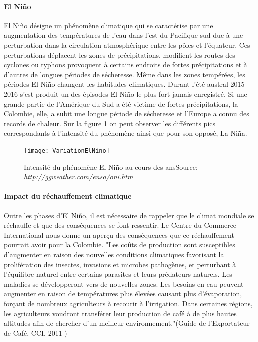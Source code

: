 


\paragraph{El Niño}El Niño désigne un phénomène climatique qui se caractérise par une augmentation des températures de l'eau dans l'est du Pacifique sud due à une perturbation dans la circulation atmosphérique entre les pôles et l'équateur. Ces perturbations déplacent les zones de précipitations, modifient les routes des cyclones ou typhons provoquent à certains endroits de fortes précipitations et à d'autres de longues périodes de sécheresse. Même dans les zones tempérées, les périodes El Niño changent les habitudes climatiques. Durant l'été austral 2015-2016 s'est produit un des épisodes El Niño le plus fort jamais enregistré\cite{OMM}. Si une grande partie de l'Amérique du Sud a été victime de fortes précipitations, la Colombie, elle, a subit une longue période de sécheresse et l'Europe a connu des records de chaleur. Sur la figure \ref{Nino} on peut observer les différents pics correspondants à l'intensité du phénomène ainsi que pour son opposé, La Niña. 

\begin{figure}[H]
	\centering
	\texttt{[image: VariationElNino]}
	\caption{\label{Nino} Intensité du phénomène El Niño au cours des ans\newline Source: \textit{http://ggweather.com/enso/oni.htm}}
\end{figure}

\paragraph{Impact du réchauffement climatique} Outre les phases d'El Niño, il est nécessaire de rappeler que le climat mondiale se réchauffe et que des conséquences se font ressentir. Le Centre du Commerce International \cite{CCI} nous donne un aperçu des conséquences que ce réchauffement pourrait avoir pour la Colombie. "Les coûts de production sont susceptibles d'augmenter en raison des nouvelles conditions climatiques favorisant la prolifération des insectes, invasions et microbes pathogènes, et perturbant à l'équilibre naturel entre certains parasites et leurs prédateurs naturels. Les maladies se développeront vers de nouvelles zones. Les besoins en eau peuvent augmenter en raison de températures plus élevées causant plus d'évaporation, forçant de nombreux agriculteurs à recourir à l'irrigation. Dans certaines régions, les agriculteurs voudront transférer leur production de café à de plus hautes altitudes afin de chercher d'un meilleur environnement."(Guide de l'Exportateur de Café, CCI, 2011 \cite{GuideCafe})


